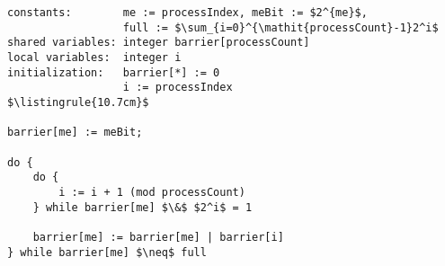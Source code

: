 \begin{center}
\begin{minipage}{\textwidth}
\begin{lstlisting}[mathescape, linewidth=10.7cm]
constants:        me := processIndex, meBit := $2^{me}$,
                  full := $\sum_{i=0}^{\mathit{processCount}-1}2^i$
shared variables: integer barrier[processCount]
local variables:  integer i
initialization:   barrier[*] := 0
                  i := processIndex
$\listingrule{10.7cm}$

barrier[me] := meBit;

do {
	do {
		i := i + 1 (mod processCount)
	} while barrier[me] $\&$ $2^i$ = 1

	barrier[me] := barrier[me] | barrier[i]
} while barrier[me] $\neq$ full
\end{lstlisting}
\end{minipage}
\end{center}
